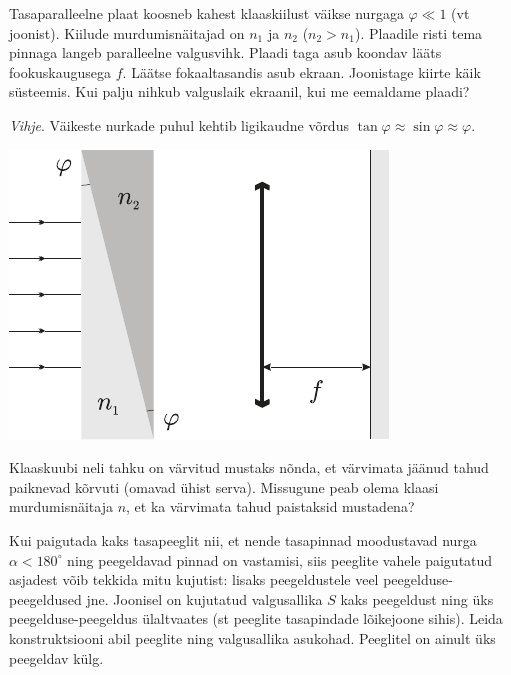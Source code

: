 \documentclass[10pt, twoside]{article}
\begin{document}
{%

Tasaparalleelne plaat koosneb kahest klaaskiilust väikse nurgaga $\varphi \ll 1$ (vt joonist). Kiilude murdumisnäitajad on $n_1$ ja $n_2$ ($n_2 > n_1$). Plaadile risti tema pinnaga langeb paralleelne valgusvihk. Plaadi taga asub koondav lääts fookuskaugusega $f$. Läätse fokaaltasandis asub ekraan. Joonistage kiirte käik süsteemis. Kui palju nihkub valguslaik ekraanil, kui me eemaldame plaadi? 

\emph{Vihje}. Väikeste nurkade puhul kehtib ligikaudne võrdus $\tan \varphi \approx \sin \varphi \approx \varphi $.

\begin{center}
	\includegraphics[width=0.6\linewidth]{2006-lahg-06-yl}
\end{center}
\probend
\bigskip


Klaaskuubi neli tahku on värvitud mustaks nõnda,
et värvimata jäänud tahud paiknevad kõrvuti (omavad ühist serva). Missugune peab olema klaasi murdumisnäitaja $n$, et ka värvimata tahud
paistaksid mustadena?
\probend
\bigskip


Kui paigutada kaks tasapeeglit nii, et nende tasapinnad moodustavad nurga $\alpha<180^\circ$ ning peegeldavad pinnad on vastamisi, siis peeglite vahele paigutatud asjadest võib tekkida mitu kujutist: lisaks peegeldustele veel peegelduse-peegeldused jne. Joonisel on kujutatud valgusallika $S$ kaks peegeldust ning üks peegelduse-peegeldus ülaltvaates (st peeglite tasapindade lõikejoone sihis). Leida konstruktsiooni abil peeglite ning valgusallika asukohad. Peeglitel on ainult üks peegeldav külg.\\

}
\end{document}
